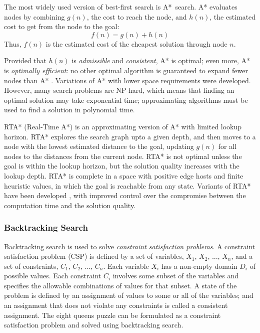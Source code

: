 The most widely used version of best-first search is
A*~search. A* evaluates nodes by combining $g(n)$, the cost to
reach the node, and $h(n)$, the estimated cost to get from the node to the
goal:
\begin{equation}
\label{eq:a-star-heuristic}
f(n)=g(n)+h(n)
\end{equation}
Thus, $f(n)$ is the estimated cost of the cheapest solution through
node $n$.

Provided that $h(n)$ is {\em admissible} and {\em consistent}, A*
is optimal; even more, A* is {\em optimally efficient}: no
other optimal algorithm is guaranteed to expand fewer nodes than A*
\cite{Russell.aima}. Variations of A* with lower space requirements
were developed. However, many search problems are NP-hard, which
means that finding an optimal solution may take exponential time;
approximating algorithms must be used to find a solution in polynomial
time.

RTA* (Real-Time A*) \cite{Korf.rta} is an approximating version of A*
with limited lookup horizon. RTA* explores the search graph upto a
given depth, and then moves to a node with the lowest estimated
distance to the goal, updating $g(n)$ for all nodes to the distances
from the current node. RTA* is not optimal unless the goal is within
the lookup horizon, but the solution quality increases with  the
lookup depth. RTA* is complete in a space with positive edge hosts and
finite heuristic values, in which the goal is reachable from any state.
Variants of RTA* have been developed \cite{Russell.right},
\cite{Bulitko.dynamiccontrol}  with improved control over the
compromise between the computation time and the solution quality.

\subsubsection{Backtracking Search}
\label{sec:bg-backtracking-search}

Backtracking search is used to solve {\em constraint satisfaction
problems}. A constraint satisfaction problem (CSP) is defined by a set
of variables, $X_1$, $X_2$, ..., $X_n$, and a set of constraints,
$C_1$, $C_2$, ..., $C_n$. Each variable $X_i$ has a non-empty domain
$D_i$ of possible values. Each constraint $C_i$ involves some subset
of the variables and specifies the allowable combinations of values
for that subset. A state of the problem is defined by an assignment of
values to some or all of the variables; and an assignment that does
not violate any constraints is called a consistent assignment. The eight
queens puzzle can be formulated as a constraint satisfaction problem
and solved using backtracking search.

